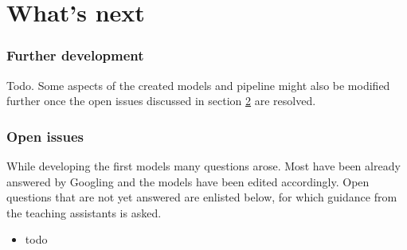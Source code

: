 \part{What's next}
\label{part:whats_next}


\section{Further development}
\label{section:further_development}

Todo.
Some aspects of the created models and pipeline might also be modified further once the open issues discussed in section \ref{section:open_issues} are resolved.


\section{Open issues}
\label{section:open_issues}

While developing the first models many questions arose. Most have been already answered by Googling and the models have been edited accordingly. Open questions that are not yet answered are enlisted below, for which guidance from the teaching assistants is asked.

\begin{itemize}
    \item todo
\end{itemize}